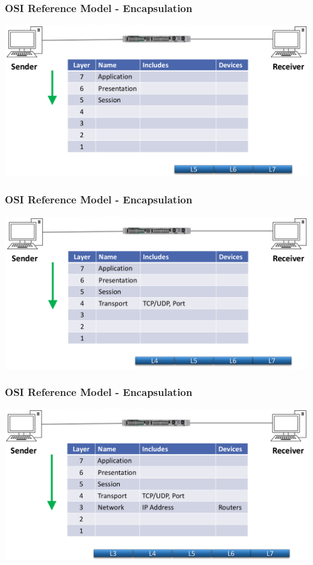 \documentclass[pdflatex,compress]{beamer}
\begin{document}
\begin{frame}
	\frametitle{OSI Reference Model - Encapsulation}
	\begin{center}
		\includegraphics[width=\linewidth]{img/img07}
	\end{center}
\end{frame}

\begin{frame}
	\frametitle{OSI Reference Model - Encapsulation}
	\begin{center}
		\includegraphics[width=\linewidth]{img/img08}
	\end{center}
\end{frame}

\begin{frame}
	\frametitle{OSI Reference Model - Encapsulation}
	\begin{center}
		\includegraphics[width=\linewidth]{img/img09}
	\end{center}
\end{frame}
\end{document}
